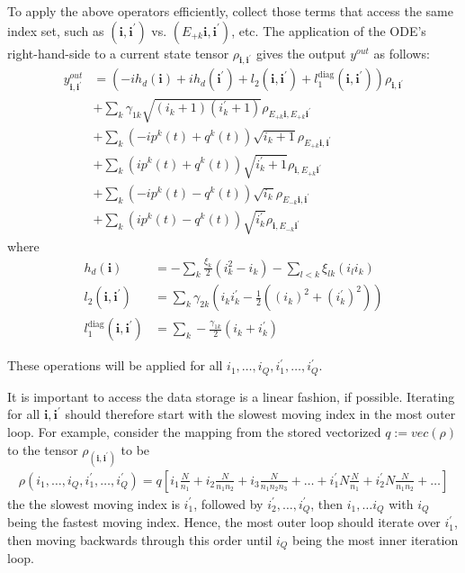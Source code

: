 \documentclass[letterpaper]{article}
\newcommand{\bfi}{\boldsymbol{i}}
\newcommand{\Epk}{E_{+k}}
\newcommand{\Emk}{E_{-k}}
\begin{document}
  To apply the above operators efficiently, collect those terms that access the
  same index set, such as $(\bfi,\bfi^\prime)$ vs. $(E_{+k}\bfi, \bfi^\prime)$,
  etc. The application of the ODE's right-hand-side to a current state tensor
  $\rho_{\bfi,\bfi^\prime}$ gives the output $y^{out}$ as follows:
  \begin{align} 
       y^{out}_{\bfi,\bfi^\prime}  &= 
       \left(-i h_d(\bfi) + ih_d(\bfi^\prime)
        + l_2(\bfi,\bfi^\prime) + l_1^{\text{diag}}(\bfi, \bfi^\prime) \right)
        \rho_{\bfi,\bfi^\prime} \\ \label{eq:applyRHS1}
        &+ \sum_k \gamma_{1k} \sqrt{(i_k+1)(i_k^\prime+1)} \rho_{E_{+k}\bfi,
        E_{+k}\bfi^\prime}\\
        &+ \sum_k \left(-ip^k(t) + q^k(t)\right) \sqrt{i_k+1} \rho_{\Epk \bfi,
        \bfi^\prime} \\
        &+ \sum_k \left( ip^k(t) + q^k(t)\right) \sqrt{i_k^\prime+1}
        \rho_{\bfi,\Epk \bfi^\prime} \\
        &+ \sum_k \left(-ip^k(t) - q^k(t)\right) \sqrt{i_k} \rho_{\Emk \bfi,
        \bfi^\prime} \\
        &+ \sum_k \left( ip^k(t) - q^k(t)\right) \sqrt{i_k^\prime}
        \rho_{\bfi,\Emk \bfi^\prime}  \label{eq:applyRHS2}
  \end{align}
  where 
  \begin{align}
    h_d(\bfi) &= -\sum_k \frac{\xi_k}{2}(i_k^2 - i_k) - \sum_{l<k} \xi_{lk} (i_l
    i_k) \\
    l_2(\bfi,\bfi^\prime) &= \sum_k \gamma_{2k} \left(i_ki_k^\prime - \frac 12
    \left( (i_k)^2 + (i_k^\prime)^2\right) \right)\\
    l_1^{\text{diag}}(\bfi, \bfi^\prime) &= \sum_k
    -\frac{\gamma_{1k}}{2}\left(i_k + i_k^\prime\right) 
  \end{align}

  These operations will be applied for all $i_1,\dots, i_Q, i_1^\prime, \dots,
  i_Q^\prime$. 
  
  It is important to access the data storage is a linear fashion, if possible.
  Iterating for all $\bfi, \bfi^\prime$ should therefore start with the slowest
  moving index in the most outer loop. For example, consider the mapping from
  the stored vectorized $q := vec(\rho)$ to the tensor $\rho_(\bfi,\bfi^\prime)$
  to be
    \begin{align}
        \rho(i_1,\dots,i_Q,i_1^\prime,\dots,i_Q^\prime) = q[i_1 \frac{N}{n_1} +
        i_2\frac{N}{n_1n_2} + i_3\frac{N}{n_1n_2n_3} + \dots + i_1^\prime
        N\frac{N}{n_1} + i_2^\prime N\frac{N}{n_1n_2} + \dots]
    \end{align}
  the the slowest moving index is $i_1^\prime$, followed by $i_2^\prime, \dots,
  i_Q^\prime$, then $i_1, \dots i_Q$ with $i_Q$ being the fastest moving index.
  Hence, the most outer loop should iterate over $i_1^\prime$, then moving
  backwards through this order until $i_Q$ being the most inner iteration loop.
\end{document}
